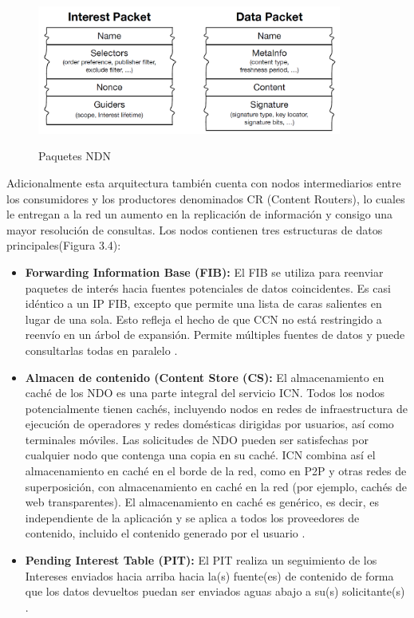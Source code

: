 \documentclass[12pt]{ociamthesis}  %
\begin{document}
\begin{figure}[!htb]
		\centering
		\includegraphics[width=10cm]{Paquetes_NDN.png}\\
		\caption{Paquetes NDN}
		\label{fig:mesh1}
\end{figure}
 
Adicionalmente esta arquitectura también cuenta con nodos intermediarios entre los consumidores y los productores denominados CR (Content Routers), lo cuales le entregan a la red un aumento en la replicación de información y consigo una mayor resolución de consultas. Los nodos contienen tres estructuras de datos principales(Figura 3.4):

\begin{itemize}
	\item\textbf{Forwarding Information Base (FIB):} El FIB se utiliza para reenviar paquetes de interés hacia fuentes potenciales de datos coincidentes. Es casi idéntico a un IP FIB, excepto que permite una lista de caras salientes en lugar de una sola. Esto refleja el hecho de que CCN no está restringido a reenvío en un árbol de expansión. Permite múltiples fuentes de datos y puede consultarlas todas en paralelo \cite{jacobson2009networking}.\\
	\item \textbf{Almacen de contenido (Content Store (CS):} El almacenamiento en caché de los NDO es una parte integral del servicio ICN. Todos los nodos potencialmente tienen cachés, incluyendo nodos en redes de infraestructura de ejecución de operadores y redes domésticas dirigidas por usuarios, así como terminales móviles. Las solicitudes de NDO pueden ser satisfechas por cualquier nodo que contenga una copia en su caché. ICN combina así el almacenamiento en caché en el borde de la red, como en P2P y otras redes de superposición, con almacenamiento en caché en la red (por ejemplo, cachés de web transparentes). El almacenamiento en caché es genérico, es decir, es independiente de la aplicación y se aplica a todos los proveedores de contenido, incluido el contenido generado por el usuario \cite{jacobson2009networking}.\\
	\item \textbf{Pending Interest Table (PIT):} El PIT realiza un seguimiento de los Intereses enviados hacia arriba hacia la(s) fuente(es) de contenido de forma que los datos devueltos puedan ser enviados aguas abajo a su(s) solicitante(s) \cite{jacobson2009networking}.\\
\end{itemize}
\end{document}
